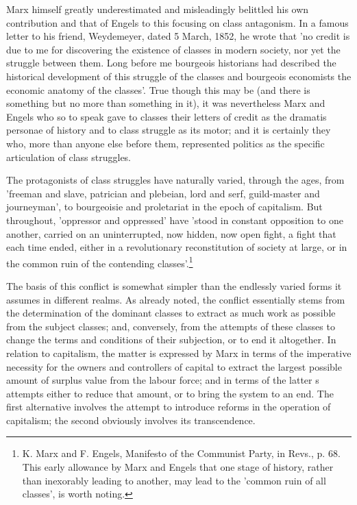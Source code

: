 Marx himself greatly underestimated and misleadingly belittled his own contribution and that of Engels to this focusing on class antagonism. In a famous letter to his friend, Weydemeyer, dated 5 March, 1852, he wrote that 'no credit is due to me for discovering the existence of classes in modern society, nor yet the struggle between them. Long before me bourgeois historians had described the historical development of this struggle of the classes and bourgeois economists the economic anatomy of the classes'. True though this may be (and there is something but no more than something in it), it was nevertheless Marx and Engels who so to speak gave to classes their letters of credit as the dramatis personae of history and to class struggle as its motor; and it is certainly they who, more than anyone else before them, represented politics as the specific articulation of class struggles.

The protagonists of class struggles have naturally varied, through the ages, from 'freeman and slave, patrician and plebeian, lord and serf, guild-master and journeyman', to bourgeoisie and proletariat in the epoch of capitalism. But throughout, 'oppressor and oppressed' have 'stood in constant opposition to one another, carried on an uninterrupted, now hidden, now open fight, a fight that each time ended, either in a revolutionary reconstitution of society at large, or in the common ruin of the contending classes'.\footnote{K. Marx and F. Engels, Manifesto of the Communist Party, in Revs., p. 68. This early allowance by Marx and Engels that one stage of history, rather than inexorably leading to another, may lead to the 'common ruin of all classes', is worth noting.}

The basis of this conflict is somewhat simpler than the endlessly varied forms it assumes in different realms. As already noted, the conflict essentially stems from the determination of the dominant classes to extract as much work as possible from the subject classes; and, conversely, from the attempts of these classes to change the terms and conditions of their subjection, or to end it altogether. In relation to capitalism, the matter is expressed by Marx in terms of the imperative necessity for the owners and controllers of capital to extract the largest possible amount of surplus value from the labour force; and in terms of the latter s attempts either to reduce that amount, or to bring the system to an end. The first alternative involves the attempt to introduce reforms in the operation of capitalism; the second obviously involves its transcendence.

